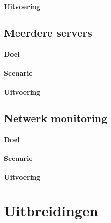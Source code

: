 \paragraph{Uitvoering}


\subsection{Meerdere servers}
\paragraph{Doel}


\paragraph{Scenario}


\paragraph{Uitvoering}



\subsection{Netwerk monitoring}
\paragraph{Doel}


\paragraph{Scenario}


\paragraph{Uitvoering}


\section{Uitbreidingen}



